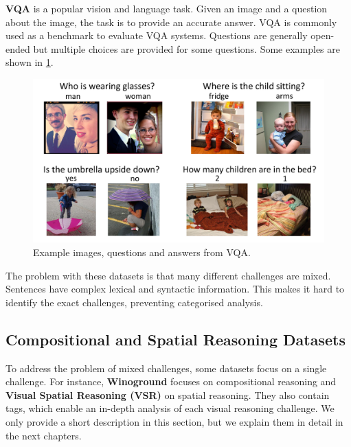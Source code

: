 \textbf{VQA} \cite{antol2015vqa} is a popular vision and language task. Given an image and a question about the image, the task is to provide an accurate answer. VQA is commonly used as a benchmark to evaluate VQA systems. Questions are generally open-ended but multiple choices are provided for some questions. Some examples are shown in \cref{fig:vqa_examples}.

\begin{figure}[ht]
    \centering
    \includegraphics[width=\linewidth]{images/datasets/vqa_examples.pdf}
    \caption{Example images, questions and answers from VQA.}
    \label{fig:vqa_examples}
\end{figure}

The problem with these datasets is that many different challenges are mixed. Sentences have complex lexical and syntactic information. This makes it hard to identify the exact challenges, preventing categorised analysis.

\subsection{Compositional and Spatial Reasoning Datasets} \label{sec:compositional_spatial_reasoning_datasets}

To address the problem of mixed challenges, some datasets focus on a single challenge. For instance, \textbf{Winoground} \cite{thrush2022winoground} focuses on compositional reasoning and \textbf{Visual Spatial Reasoning (VSR)} \cite{liu2022visual} on spatial reasoning. They also contain tags, which enable an in-depth analysis of each visual reasoning challenge. We only provide a short description in this section, but we explain them in detail in the next chapters.

